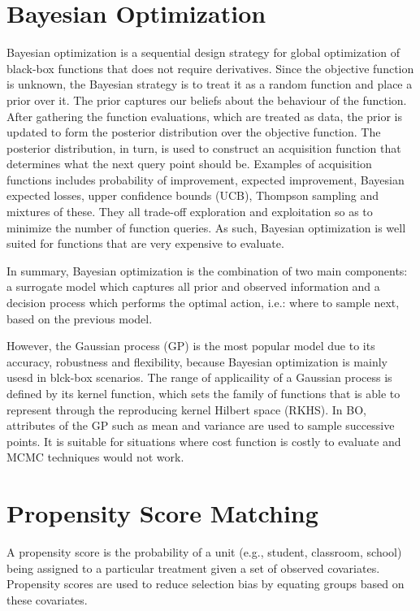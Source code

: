 \documentclass{article}
\begin{document}
\section{Bayesian Optimization}
Bayesian optimization is a sequential design strategy for global optimization of black-box functions that does not require derivatives. Since the objective function is unknown, the Bayesian
strategy is to treat it as a random function and place a prior over it. The prior captures our beliefs about the behaviour of the
function. After gathering the function evaluations, which are treated
as data, the prior is updated to form the posterior distribution
over the objective function. The posterior distribution, in turn, is
used to construct an acquisition function that determines what the
next query point should be. Examples of acquisition functions includes
probability of improvement, expected improvement, Bayesian expected
losses, upper confidence bounds (UCB), Thompson sampling and mixtures
of these. They all trade-off exploration and exploitation so as to
minimize the number of function queries. As such, Bayesian
optimization is well suited for functions that are very expensive to evaluate.

In summary, Bayesian optimization is the combination of two main components: a surrogate model which captures all prior and observed information and a decision process which performs the optimal action, i.e.: where to sample next, based on the previous model.

However, the Gaussian process (GP) is the most popular model due to
its accuracy, robustness and flexibility, because Bayesian
optimization is mainly usesd in blck-box scenarios. The range of
applicaility of a Gaussian process is defined by its kernel function,
which sets the family of functions that is able to represent through
the reproducing kernel Hilbert space (RKHS). In BO, attributes of the
GP such as mean and variance are used to sample successive points. It
is suitable for situations where cost function is costly to evaluate
and MCMC techniques would not work.

\section{Propensity Score Matching}
A propensity score is the probability of a unit (e.g., student,
classroom, school) being assigned to a particular treatment given a
set of observed covariates. Propensity scores are used to reduce
selection bias by equating groups based on these covariates.
\end{document}
